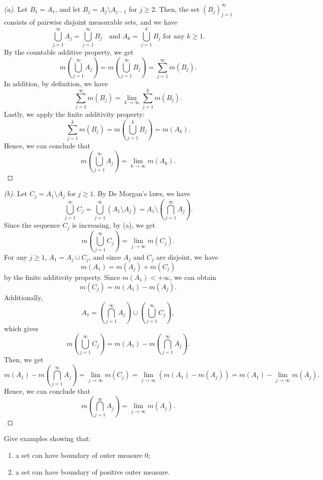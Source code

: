 \begin{proof}[(a)]
    Let $B_1=A_1$, and let $B_j = A_j \setminus A_{j-1}$ for $j \ge 2$. Then, the set $(B_j)_{j=1}^\infty$ consists of pairwise disjoint measurable sets, and we have
    \[
    \bigcup_{j=1}^\infty A_j = \bigcup_{j=1}^\infty B_j \quad \text{and $A_k = \bigcup_{j=1}^k B_j$ for any $k \ge 1$.}
    \]
    By the countable additive property, we get
    \[
    m(\bigcup_{j=1}^\infty A_j) = m(\bigcup_{j=1}^\infty B_j) = \sum_{j=1}^\infty m(B_j).
    \]
    In addition, by definition, we have
    \[
    \sum_{j=1}^\infty m(B_j) = \lim_{k \to \infty} \sum_{j=1}^k m(B_j).
    \]
    Lastly, we apply the finite additivity property:
    \[
    \sum_{j=1}^k m(B_j) = m(\bigcup_{j=1}^k B_j) = m(A_k).
    \]
    Hence, we can conclude that
    \[
    m(\bigcup_{j=1}^\infty A_j) = \lim_{k \to \infty} m(A_k).
    \]    
\end{proof}

\begin{proof}[(b)]
    Let $C_j = A_1 \setminus A_j$ for $j \ge 1$. By De Morgan's laws, we have
    \[
    \bigcup_{j=1}^\infty C_j = \bigcup_{j=1}^\infty (A_1 \setminus A_j) = A_1 \setminus (\bigcap_{j=1}^\infty A_j).
    \]
    Since the sequence $C_j$ is increasing, by (a), we get
    \[
    m(\bigcup_{j=1}^\infty C_j) = \lim_{j \to \infty} m(C_j).
    \]
    For any $j \ge 1$, $A_1=A_j \cup C_j$, and since $A_j$ and $C_j$ are disjoint, we have 
    \[
    m(A_1) = m(A_j) + m(C_j)
    \]
    by the finite additivity property. Since $m(A_1) < +\infty$, we can obtain
    \[
    m(C_j) = m(A_1) - m(A_j).
    \]
    Additionally,
    \[
    A_1 = (\bigcap_{j=1}^\infty A_j) \cup (\bigcup_{j=1}^\infty C_j),
    \]
    which gives
    \[
    m(\bigcup_{j=1}^\infty C_j) = m(A_1) - m(\bigcap_{j=1}^\infty A_j).
    \]
    Then, we get
    \[
    m(A_1) - m(\bigcap_{j=1}^\infty A_j) = \lim_{j \to \infty} m(C_j) = \lim_{j \to \infty} (m(A_1) - m(A_j)) = m(A_1) - \lim_{j \to \infty} m(A_j).
    \]
    Hence, we can conclude that
    \[
    m(\bigcap_{j=1}^\infty A_j) = \lim_{j \to \infty} m(A_j).
    \]
\end{proof}

\begin{problem}

Give examples showing that:
\begin{enumerate}
    \item a set can have boundary of outer measure $0$;
    \item a set can have boundary of positive outer measure.
\end{enumerate}

\end{problem}

